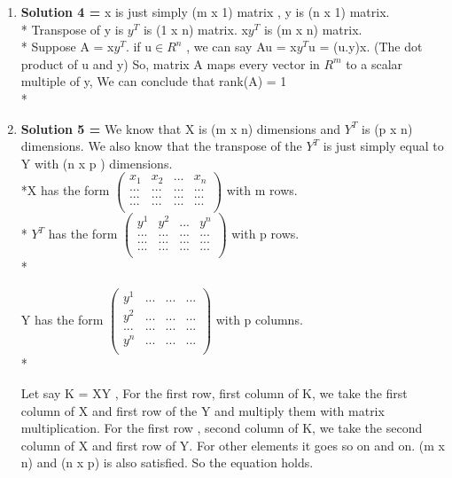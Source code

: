 \documentclass[11pt]{article}
\begin{document}
\begin{enumerate}
\item  \textbf{Solution 4 = }  x is just simply (m x 1) matrix , y is  (n x 1) matrix. \\* Transpose of y is $y^{T}$ is (1 x n) matrix. x$y^{T}$ is (m x n) matrix. \\*
Suppose A = x$y^{T}$. if u$\in$$R^{n}$ , we can say Au = x$y^{T}$u = (u.y)x. (The dot product of u and y) So,  matrix A maps every vector in $R^{m}$ to a scalar multiple of y, We can conclude that rank(A) = 1
 \\*
\item \textbf{Solution 5 = } We know that X is (m x n) dimensions and $Y^{T}$ is (p x n) dimensions. We also know that the transpose of the $Y^{T}$ is just simply equal to Y with (n x p ) dimensions. \\*X has the form $\begin  {pmatrix}
{x_1}&{x_2}&...&{x_n}\\
...&...&...&...\\
...&...&...&...\\
...&...&...&...\\ 
\end{pmatrix}
$ with m rows. \\*
$Y^{T}$ has the form $\begin  {pmatrix}
y^{1}&y^{2}&...&y^{n}\\
...&...&...&...\\
...&...&...&...\\
...&...&...&...\\ 
\end{pmatrix}
$ with p rows. \\*

Y has the form $\begin  {pmatrix}
y^{1}&...&...&...\\
y^{2}&...&...&...\\
...&...&...&...\\
y^{n}&...&...&...\\ 
\end{pmatrix}
$ with p columns. \\*

Let say K = XY , For the first row, first column of K,  we take the first column of X and first row of the Y
and multiply them with matrix multiplication. For the first row , second column of K, we take the second column of X  and first row of Y.  For other elements it goes so on and on. (m x n) and (n x p) is also satisfied. So the equation holds.



\end{enumerate}
\end{document}
